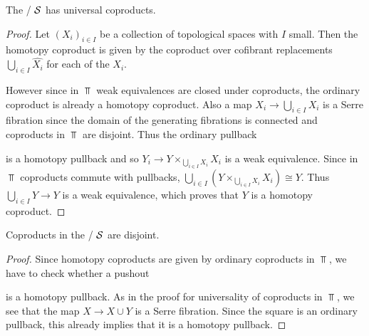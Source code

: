 \begin{lemma}
    The \inftycat/ $\mathcal{S}$ has universal coproducts.
    \begin{proof}
        	Let $\left(X_i\right)_{i\in I}$ be a collection of topological spaces with $I$ small. 
            Then the homotopy coproduct is given by the coproduct over cofibrant replacements $\bigcup\limits_{i\in I}\widehat{X_i}$ for each of the $X_i$.

            However since in $\Top$ weak equivalences are closed under coproducts, the ordinary coproduct is already a homotopy coproduct.
            Also a map $X_i\to\bigcup\limits_{i\in I} X_i$ is a Serre fibration since the domain of the generating fibrations is connected and coproducts in $\Top$ are disjoint.
            Thus the ordinary pullback
            \begin{center}
            \end{center}
            is a homotopy pullback and so $Y_i\to Y\times_{\bigcup\limits_{i\in I} X_i}X_i$ is a weak equivalence.
            Since in $\Top$ coproducts commute with pullbacks, $\bigcup\limits_{i\in I}\left(Y\times_{\bigcup\limits_{i\in I} X_i}X_i\right)\cong Y$.
            Thus $\bigcup\limits_{i\in I}Y\to Y$ is a weak equivalence, which proves that $Y$ is a homotopy coproduct.
    \end{proof}
\end{lemma}
\begin{lemma}
    Coproducts in the \inftycat/ $\mathcal{S}$ are disjoint.
    \begin{proof}
        Since homotopy coproducts are given by ordinary coproducts in $\Top$, we have to check whether a pushout
        \begin{center}
        \end{center}
        is a homotopy pullback.
        As in the proof for universality of coproducts in $\Top$, we see that the map $X\to X\cup Y$ is a Serre fibration.
        Since the square is an ordinary pullback, this already implies that it is a homotopy pullback.
    \end{proof}
\end{lemma}
